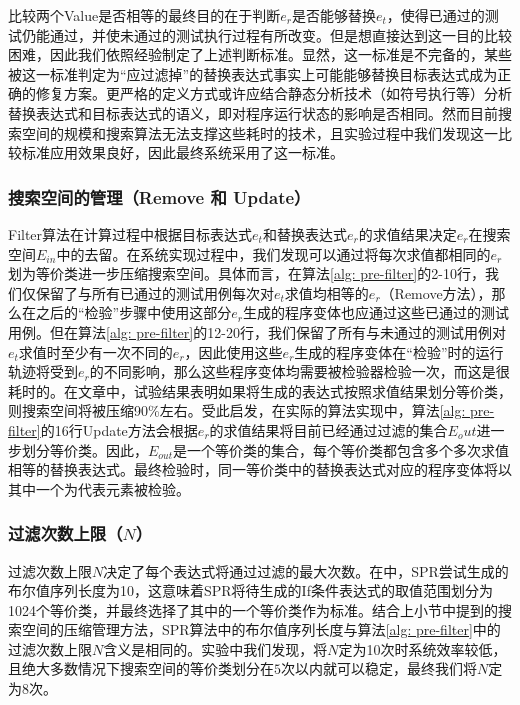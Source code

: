 比较两个Value是否相等的最终目的在于判断$e_r$是否能够替换$e_t$，使得已通过的测试仍能通过，并使未通过的测试执行过程有所改变。但是想直接达到这一目的比较困难，因此我们依照经验制定了上述判断标准。显然，这一标准是不完备的，某些被这一标准判定为“应过滤掉”的替换表达式事实上可能能够替换目标表达式成为正确的修复方案。更严格的定义方式或许应结合静态分析技术（如符号执行等）分析替换表达式和目标表达式的语义，即对程序运行状态的影响是否相同。然而目前搜索空间的规模和搜索算法无法支撑这些耗时的技术，且实验过程中我们发现这一比较标准应用效果良好，因此最终系统采用了这一标准。

\subsubsection{搜索空间的管理（Remove 和 Update）}

Filter算法在计算过程中根据目标表达式$e_t$和替换表达式$e_r$的求值结果决定$e_r$在搜索空间$E_{in}$中的去留。在系统实现过程中，我们发现可以通过将每次求值都相同的$e_r$划为等价类进一步压缩搜索空间。具体而言，在算法\ref{alg: pre-filter}的2-10行，我们仅保留了与所有已通过的测试用例每次对$e_t$求值均相等的$e_r$（Remove方法），那么在之后的“检验”步骤中使用这部分$e_r$生成的程序变体也应通过这些已通过的测试用例。但在算法\ref{alg: pre-filter}的12-20行，我们保留了所有与未通过的测试用例对$e_t$求值时至少有一次不同的$e_r$，因此使用这些$e_r$生成的程序变体在“检验”时的运行轨迹将受到$e_r$的不同影响，那么这些程序变体均需要被检验器检验一次，而这是很耗时的。在文章\cite{Galenson:2014:CDI:2568225.2568250}中，试验结果表明如果将生成的表达式按照求值结果划分等价类，则搜索空间将被压缩90\%左右。受此启发，在实际的算法实现中，算法\ref{alg: pre-filter}的16行Update方法会根据$e_r$的求值结果将目前已经通过过滤的集合$E_out$进一步划分等价类。因此，$E_{out}$是一个等价类的集合，每个等价类都包含多个多次求值相等的替换表达式。最终检验时，同一等价类中的替换表达式对应的程序变体将以其中一个为代表元素被检验。


\subsubsection{过滤次数上限（$N$）}

过滤次数上限$N$决定了每个表达式将通过过滤的最大次数。在\cite{Long:2015:SPR:2786805.2786811}中，SPR尝试生成的布尔值序列长度为10，这意味着SPR将待生成的If条件表达式的取值范围划分为1024个等价类，并最终选择了其中的一个等价类作为标准。结合上小节中提到的搜索空间的压缩管理方法，SPR算法中的布尔值序列长度与算法\ref{alg: pre-filter}中的过滤次数上限$N$含义是相同的。实验中我们发现，将$N$定为10次时系统效率较低，且绝大多数情况下搜索空间的等价类划分在$5$次以内就可以稳定，最终我们将$N$定为8次。


